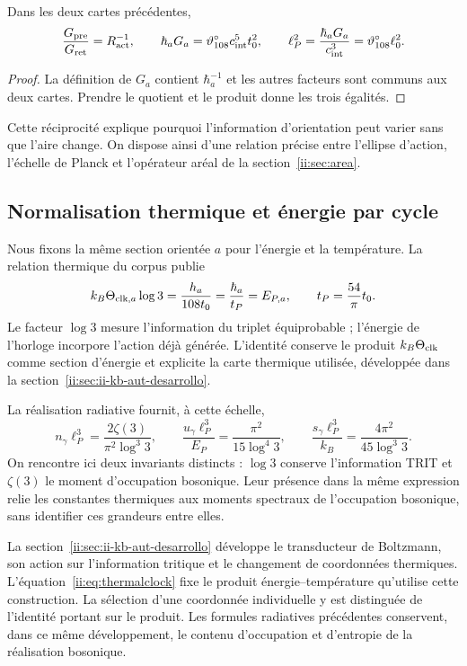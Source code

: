 \begin{proposition}
Dans les deux cartes précédentes,
\[
\frac{G_{\rm pre}}{G_{\rm ret}}=R_{\rm act}^{-1},\qquad
\hbar_aG_a=\vartheta^\circ_{108}c_{\rm int}^5t_0^2,
\qquad
\ell_P^2=\frac{\hbar_aG_a}{c_{\rm int}^3}
=\vartheta^\circ_{108}\ell_0^2.
\]
\end{proposition}
\begin{proof}
La définition de $G_a$ contient $\hbar_a^{-1}$ et les autres facteurs
sont communs aux deux cartes. Prendre le quotient et le produit donne
les trois égalités.
\end{proof}
Cette réciprocité explique pourquoi l'information d'orientation peut
varier sans que l'aire change. On dispose ainsi d'une relation précise
entre l'ellipse d'action, l'échelle de Planck et l'opérateur aréal
de la section~\ref{ii:sec:area}.

\subsection{Normalisation thermique et énergie par cycle}
Nous fixons la même section orientée \(a\) pour l'énergie et la
température. La relation thermique du corpus publie
\begin{equation}
k_B\Theta_{{\rm clk},a}\log3
=\frac{h_a}{108t_0}
=\frac{\hbar_a}{t_P}=E_{P,a},
\qquad t_P=\frac{54}{\pi}t_0.
\label{ii:eq:thermalclock}
\end{equation}
Le facteur $\log3$ mesure l’information du triplet équiprobable ;
l’énergie de l’horloge incorpore l’action déjà générée.
L’identité conserve le produit $k_B\Theta_{\rm clk}$ comme section
d’énergie et explicite la carte thermique utilisée, développée dans la section~\ref{ii:sec:ii-kb-aut-desarrollo}.

La réalisation radiative fournit, à cette échelle,
\[
n_\gamma\ell_P^3=\frac{2\zeta(3)}{\pi^2\log^3 3},\qquad
\frac{u_\gamma\ell_P^3}{E_P}
=\frac{\pi^2}{15\log^4 3},\qquad
\frac{s_\gamma\ell_P^3}{k_B}
=\frac{4\pi^2}{45\log^3 3}.
\]
On rencontre ici deux invariants distincts : $\log3$ conserve
l’information TRIT et $\zeta(3)$ le moment d’occupation bosonique.
Leur présence dans la même expression relie les constantes thermiques
aux moments spectraux de l’occupation bosonique, sans identifier
ces grandeurs entre elles.

La section~\ref{ii:sec:ii-kb-aut-desarrollo} développe le transducteur
de Boltzmann, son action sur l'information tritique et le changement de
coordonnées thermiques. L'équation~\eqref{ii:eq:thermalclock} fixe le
produit énergie--température qu'utilise cette construction.
La sélection d'une coordonnée individuelle y est distinguée de
l'identité portant sur le produit. Les formules radiatives précédentes
conservent, dans ce même développement, le contenu d'occupation et
d'entropie de la réalisation bosonique.

